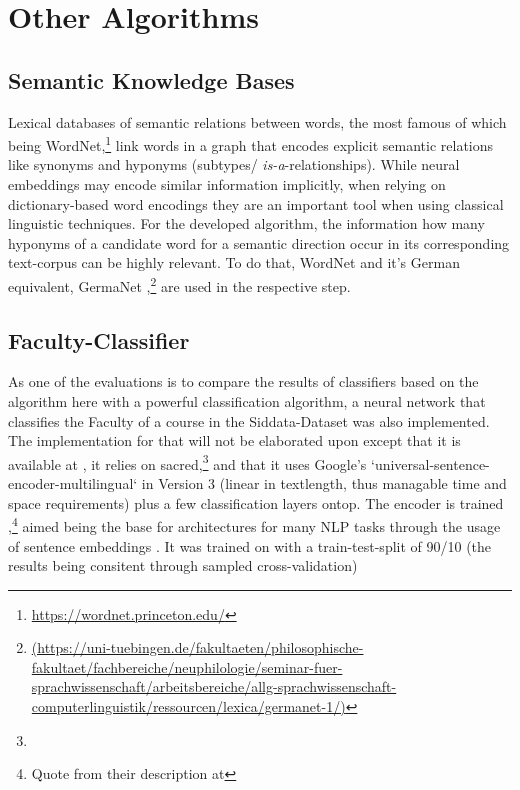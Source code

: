 \section{Other Algorithms}

\subsection{Semantic Knowledge Bases}

Lexical databases of semantic relations between words, the most famous of which being WordNet,\footnote{\url{https://wordnet.princeton.edu/}} link words in a graph that encodes explicit semantic relations like synonyms and hyponyms (subtypes/ \emph{is-a}-relationships). While neural %
embeddings may encode similar information implicitly, when relying on dictionary-based word encodings they are an important tool when using classical linguistic techniques. For the developed algorithm, the information how many hyponyms of a candidate word for a semantic direction %
occur in its corresponding text-corpus can be highly relevant. To do that, WordNet \cite{Miller1995} and it's German equivalent, GermaNet \cite{hamp-feldweg-1997-germanet,Henrich},\footnote{\url{(https://uni-tuebingen.de/fakultaeten/philosophische-fakultaet/fachbereiche/neuphilologie/seminar-fuer-sprachwissenschaft/arbeitsbereiche/allg-sprachwissenschaft-computerlinguistik/ressourcen/lexica/germanet-1/)}} are used in the respective step.


\subsection{Faculty-Classifier}
\label{sec:faculty_classifier}

As one of the evaluations is to compare the results of classifiers based on the algorithm here with a powerful classification algorithm, a neural network that classifies the Faculty of a course in the Siddata-Dataset was also implemented. The implementation for that will not be elaborated upon except that it is available at , it relies on sacred,\footnote{} and that it uses Google's `universal-sentence-encoder-multilingual` in Version 3 (linear in textlength, thus managable time and space requirements) plus a few classification layers ontop. The encoder is trained ,\footnote{Quote from their description at   } aimed being the base for architectures for many NLP tasks through the usage of sentence embeddings \cite{Guo}. It was trained on with a train-test-split of 90/10 (the results being consitent through sampled cross-validation)


